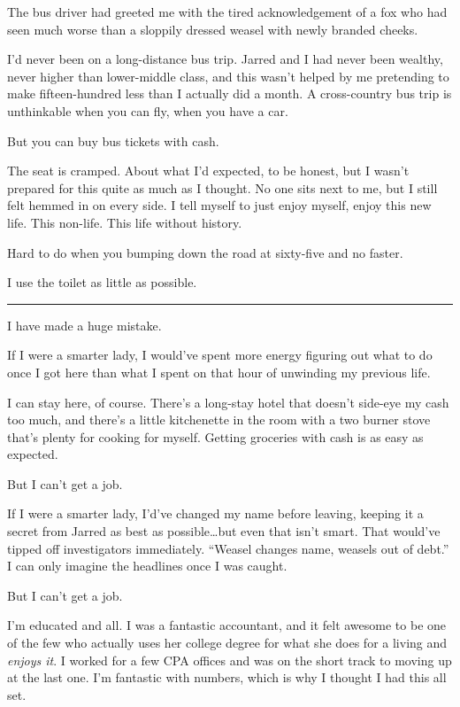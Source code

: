 The bus driver had greeted me with the tired acknowledgement of a fox who had seen much worse than a sloppily dressed weasel with newly branded cheeks.

I'd never been on a long-distance bus trip. Jarred and I had never been wealthy, never higher than lower-middle class, and this wasn't helped by me pretending to make fifteen-hundred less than I actually did a month. A cross-country bus trip is unthinkable when you can fly, when you have a car.

But you can buy bus tickets with cash.

The seat is cramped. About what I'd expected, to be honest, but I wasn't prepared for this quite as much as I thought. No one sits next to me, but I still felt hemmed in on every side. I tell myself to just enjoy myself, enjoy this new life. This non-life. This life without history.

Hard to do when you bumping down the road at sixty-five and no faster.

I use the toilet as little as possible.

\begin{center}\rule{0.5\linewidth}{\linethickness}\end{center}

I have made a huge mistake.

If I were a smarter lady, I would've spent more energy figuring out what to do once I got here than what I spent on that hour of unwinding my previous life.

I can stay here, of course. There's a long-stay hotel that doesn't side-eye my cash too much, and there's a little kitchenette in the room with a two burner stove that's plenty for cooking for myself. Getting groceries with cash is as easy as expected.

But I can't get a job.

If I were a smarter lady, I'd've changed my name before leaving, keeping it a secret from Jarred as best as possible\ldots{}but even that isn't smart. That would've tipped off investigators immediately. ``Weasel changes name, weasels out of debt.'' I can only imagine the headlines once I was caught.

But I can't get a job.

I'm educated and all. I was a fantastic accountant, and it felt awesome to be one of the few who actually uses her college degree for what she does for a living and \emph{enjoys it}. I worked for a few CPA offices and was on the short track to moving up at the last one. I'm fantastic with numbers, which is why I thought I had this all set.

